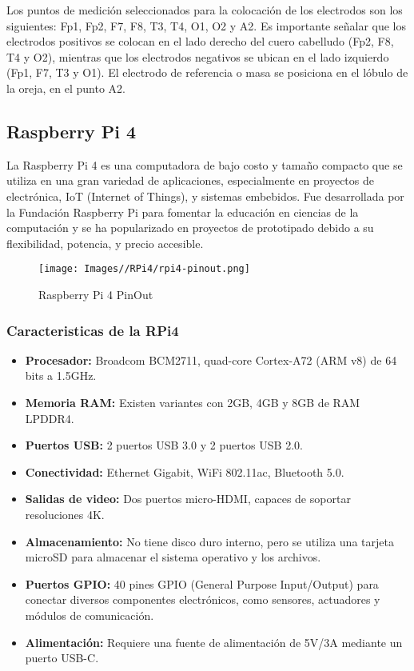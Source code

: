 \documentclass{article}
\begin{document}
Los puntos de medición seleccionados para la colocación de los electrodos son los siguientes: Fp1, Fp2, F7, F8, T3, T4, O1, O2 y A2. Es importante señalar que los electrodos positivos se colocan en el lado derecho del cuero cabelludo (Fp2, F8, T4 y O2), mientras que los electrodos negativos se ubican en el lado izquierdo (Fp1, F7, T3 y O1). El electrodo de referencia o masa se posiciona en el lóbulo de la oreja, en el punto A2.

\subsection{Raspberry Pi 4}
La Raspberry Pi 4 es una computadora de bajo costo y tamaño compacto que se utiliza en una gran variedad de aplicaciones, especialmente en proyectos de electrónica, IoT (Internet of Things), y sistemas embebidos. Fue desarrollada por la Fundación Raspberry Pi para fomentar la educación en ciencias de la computación y se ha popularizado en proyectos de prototipado debido a su flexibilidad, potencia, y precio accesible.
\begin{figure}[H]
    \centering
    \texttt{[image: Images//RPi4/rpi4-pinout.png]}
    \caption{Raspberry Pi 4 PinOut}
    \label{fig:enter-label}
\end{figure}

\subsubsection{Caracteristicas de la RPi4}
\begin{itemize}
    \item \textbf{Procesador:} Broadcom BCM2711, quad-core Cortex-A72 (ARM v8) de 64 bits a 1.5GHz.
    \item \textbf{Memoria RAM:} Existen variantes con 2GB, 4GB y 8GB de RAM LPDDR4.
    \item \textbf{Puertos USB:} 2 puertos USB 3.0 y 2 puertos USB 2.0.
    \item \textbf{Conectividad:} Ethernet Gigabit, WiFi 802.11ac, Bluetooth 5.0.
    \item \textbf{Salidas de video:} Dos puertos micro-HDMI, capaces de soportar resoluciones 4K.
    \item \textbf{Almacenamiento:} No tiene disco duro interno, pero se utiliza una tarjeta microSD para almacenar el sistema operativo y los archivos.
    \item \textbf{Puertos GPIO:} 40 pines GPIO (General Purpose Input/Output) para conectar diversos componentes electrónicos, como sensores, actuadores y módulos de comunicación.
    \item \textbf{Alimentación:} Requiere una fuente de alimentación de 5V/3A mediante un puerto USB-C.
\end{itemize}
\end{document}
